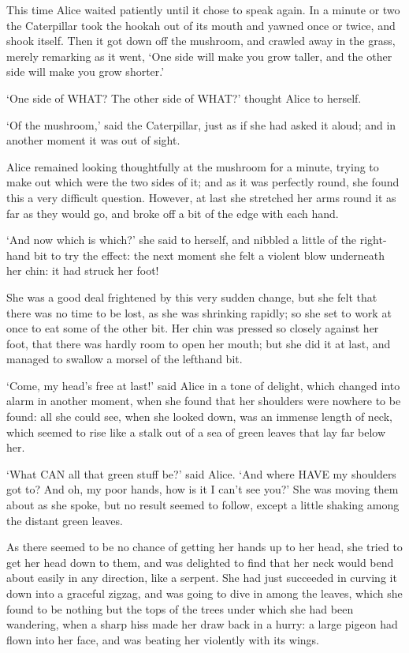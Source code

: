 \documentclass[12pt]{book}
\begin{document}
  This time Alice waited patiently until it chose to speak again.
In a minute or two the Caterpillar took the hookah out of its
mouth and yawned once or twice, and shook itself.  Then it got
down off the mushroom, and crawled away in the grass, merely
remarking as it went, `One side will make you grow taller, and
the other side will make you grow shorter.'

  `One side of WHAT?  The other side of WHAT?' thought Alice to
herself.

  `Of the mushroom,' said the Caterpillar, just as if she had
asked it aloud; and in another moment it was out of sight.

  Alice remained looking thoughtfully at the mushroom for a
minute, trying to make out which were the two sides of it; and as
it was perfectly round, she found this a very difficult question.
However, at last she stretched her arms round it as far as they
would go, and broke off a bit of the edge with each hand.

  `And now which is which?' she said to herself, and nibbled a
little of the right-hand bit to try the effect:  the next moment
she felt a violent blow underneath her chin:  it had struck her
foot!

  She was a good deal frightened by this very sudden change, but
she felt that there was no time to be lost, as she was shrinking
rapidly; so she set to work at once to eat some of the other bit.
Her chin was pressed so closely against her foot, that there was
hardly room to open her mouth; but she did it at last, and
managed to swallow a morsel of the lefthand bit.

  `Come, my head's free at last!' said Alice in a tone of
delight, which changed into alarm in another moment, when she
found that her shoulders were nowhere to be found:  all she could
see, when she looked down, was an immense length of neck, which
seemed to rise like a stalk out of a sea of green leaves that lay
far below her.

  `What CAN all that green stuff be?' said Alice.  `And where
HAVE my shoulders got to?  And oh, my poor hands, how is it I
can't see you?'  She was moving them about as she spoke, but no
result seemed to follow, except a little shaking among the
distant green leaves.

  As there seemed to be no chance of getting her hands up to her
head, she tried to get her head down to them, and was delighted
to find that her neck would bend about easily in any direction,
like a serpent.  She had just succeeded in curving it down into a
graceful zigzag, and was going to dive in among the leaves, which
she found to be nothing but the tops of the trees under which she
had been wandering, when a sharp hiss made her draw back in a
hurry:  a large pigeon had flown into her face, and was beating
her violently with its wings.
\end{document}
